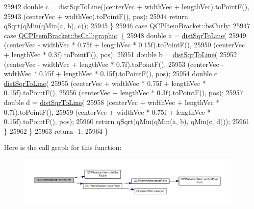 \begin{DoxyCode}
25942     \textcolor{keywordtype}{double} \hyperlink{_comparision_pictures_2_createtest_image_8m_ae0323a9039add2978bf5b49550572c7c}{c} = \hyperlink{class_q_c_p_abstract_item_acdca343717d625b8abb3c3e38c0ed39d}{distSqrToLine}((centerVec + widthVec + lengthVec).toPointF(),
25943                              (centerVec + widthVec).toPointF(), pos);
25944     \textcolor{keywordflow}{return} qSqrt(qMin(qMin(a, b), c));
25945   \}
25946   \textcolor{keywordflow}{case} \hyperlink{class_q_c_p_item_bracket_a7ac3afd0b24a607054e7212047d59dbda5024ce4023c2d8de4221f1cd4816acd8}{QCPItemBracket::bsCurly}:
25947   \textcolor{keywordflow}{case} \hyperlink{class_q_c_p_item_bracket_a7ac3afd0b24a607054e7212047d59dbda8f29f5ef754e2dc9a9efdedb2face0f3}{QCPItemBracket::bsCalligraphic}: \{
25948     \textcolor{keywordtype}{double} a = \hyperlink{class_q_c_p_abstract_item_acdca343717d625b8abb3c3e38c0ed39d}{distSqrToLine}(
25949         (centerVec - widthVec * 0.75f + lengthVec * 0.15f).toPointF(),
25950         (centerVec + lengthVec * 0.3f).toPointF(), pos);
25951     \textcolor{keywordtype}{double} b = \hyperlink{class_q_c_p_abstract_item_acdca343717d625b8abb3c3e38c0ed39d}{distSqrToLine}(
25952         (centerVec - widthVec + lengthVec * 0.7f).toPointF(),
25953         (centerVec - widthVec * 0.75f + lengthVec * 0.15f).toPointF(), pos);
25954     \textcolor{keywordtype}{double} c = \hyperlink{class_q_c_p_abstract_item_acdca343717d625b8abb3c3e38c0ed39d}{distSqrToLine}(
25955         (centerVec + widthVec * 0.75f + lengthVec * 0.15f).toPointF(),
25956         (centerVec + lengthVec * 0.3f).toPointF(), pos);
25957     \textcolor{keywordtype}{double} d = \hyperlink{class_q_c_p_abstract_item_acdca343717d625b8abb3c3e38c0ed39d}{distSqrToLine}(
25958         (centerVec + widthVec + lengthVec * 0.7f).toPointF(),
25959         (centerVec + widthVec * 0.75f + lengthVec * 0.15f).toPointF(), pos);
25960     \textcolor{keywordflow}{return} qSqrt(qMin(qMin(a, b), qMin(c, d)));
25961   \}
25962   \}
25963   \textcolor{keywordflow}{return} -1;
25964 \}
\end{DoxyCode}


Here is the call graph for this function\+:\nopagebreak
\begin{figure}[H]
\begin{center}
\leavevmode
\includegraphics[width=350pt]{class_q_c_p_item_bracket_aa6933caff1d42c54bcebc769ef88c798_cgraph}
\end{center}
\end{figure}


